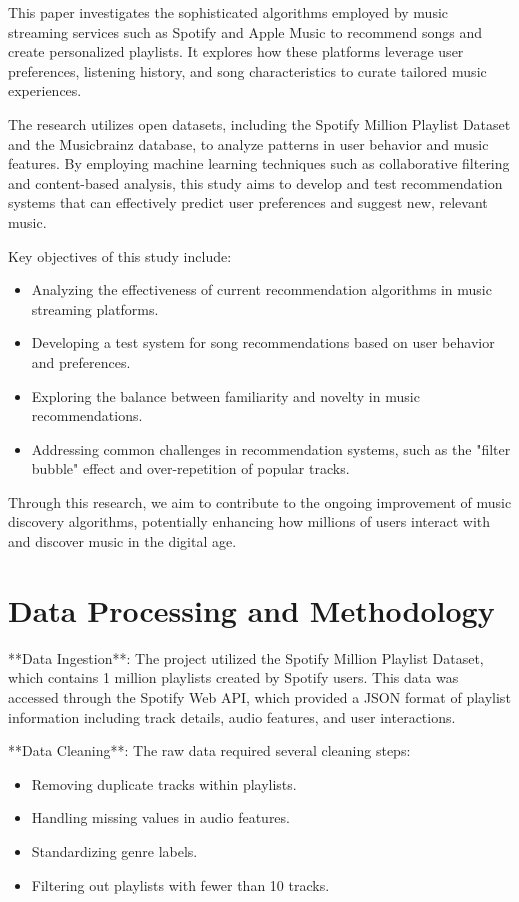 \documentclass[runningheads]{llncs}
\begin{document}
This paper investigates the sophisticated algorithms employed by music streaming services such as Spotify and Apple Music to recommend songs and create personalized playlists. It explores how these platforms leverage user preferences, listening history, and song characteristics to curate tailored music experiences.

The research utilizes open datasets, including the Spotify Million Playlist Dataset and the Musicbrainz database, to analyze patterns in user behavior and music features. By employing machine learning techniques such as collaborative filtering and content-based analysis, this study aims to develop and test recommendation systems that can effectively predict user preferences and suggest new, relevant music.

Key objectives of this study include:
\begin{itemize}
    \item Analyzing the effectiveness of current recommendation algorithms in music streaming platforms.
    \item Developing a test system for song recommendations based on user behavior and preferences.
    \item Exploring the balance between familiarity and novelty in music recommendations.
    \item Addressing common challenges in recommendation systems, such as the "filter bubble" effect and over-repetition of popular tracks.
\end{itemize}

Through this research, we aim to contribute to the ongoing improvement of music discovery algorithms, potentially enhancing how millions of users interact with and discover music in the digital age.

\section{Data Processing and Methodology}

**Data Ingestion**: The project utilized the Spotify Million Playlist Dataset, which contains 1 million playlists created by Spotify users. This data was accessed through the Spotify Web API, which provided a JSON format of playlist information including track details, audio features, and user interactions.

**Data Cleaning**: The raw data required several cleaning steps:
\begin{itemize}
    \item Removing duplicate tracks within playlists.
    \item Handling missing values in audio features.
    \item Standardizing genre labels.
    \item Filtering out playlists with fewer than 10 tracks.
\end{itemize}
\end{document}

